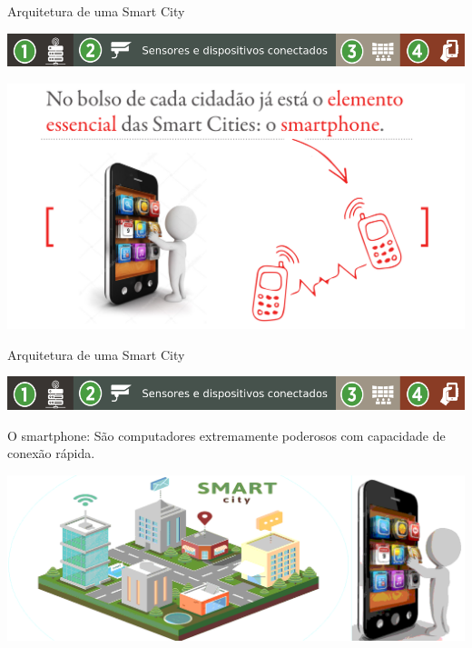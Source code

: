 \documentclass{beamer}
\begin{document}
\begin{frame}{Arquitetura de uma Smart City}
\begin{center}
\includegraphics[width=1\textwidth]{img/arquitetura-menu-2.png}  
\end{center}
\begin{center}
\includegraphics[width=1\textwidth]{img/smartphone.png}  
\end{center}


\end{frame}




\begin{frame}{Arquitetura de uma Smart City}
\begin{center}
\includegraphics[width=1\textwidth]{img/arquitetura-menu-2.png}  
\end{center}
\begin{block}{O smartphone:}
São computadores extremamente poderosos com capacidade de conexão rápida. 
\end{block}
\includegraphics[width=.7\textwidth]{img/smart-city.png}
\end{frame}
\end{document}
